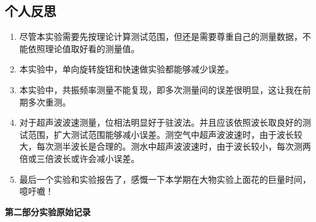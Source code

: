 \documentclass[11pt]{article}
\begin{document}
\subsection{个人反思}
\begin{enumerate}
    \item 尽管本实验需要先按理论计算测试范围，但还是需要尊重自己的测量数据，不能依照理论值取好看的测量值。
    \item 本实验中，单向旋转旋钮和快速做实验都能够减少误差。
    \item 本实验中，共振频率测量不能复现，即多次测量间的误差很明显，这让我在前期多次重测。
    \item 对于超声波波速测量，位相法明显好于驻波法。并且应该依照波长取良好的测试范围，扩大测试范围能够减小误差。测空气中超声波波速时，由于波长较大，每次测半波长是合理的。测水中超声波波速时，由于波长较小，每次测两倍或三倍波长或许会减小误差。
    \item 最后一个实验和实验报告了，感慨一下本学期在大物实验上面花的巨量时间，噫吁嚱！
\end{enumerate}

\begin{center}
    \vspace*{1em}
    \Large \bf 第二部分\qquad 实验原始记录
\end{center}

\end{document}
